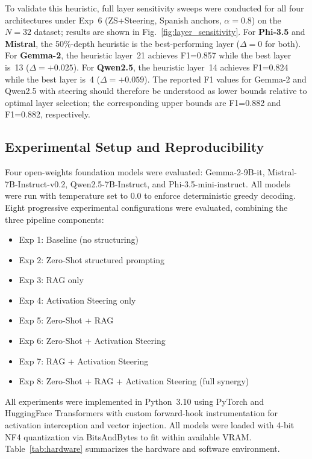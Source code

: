 \documentclass{ieeeaccess}
\begin{document}
To validate this heuristic, full layer sensitivity sweeps were conducted for all four architectures under Exp~6 (ZS+Steering, Spanish anchors, $\alpha=0.8$) on the $N=32$ dataset; results are shown in Fig.~\ref{fig:layer_sensitivity}. For \textbf{Phi-3.5} and \textbf{Mistral}, the 50\%-depth heuristic is the best-performing layer ($\Delta = 0$ for both). For \textbf{Gemma-2}, the heuristic layer~21 achieves F1=0.857 while the best layer is~13 ($\Delta=+0.025$). For \textbf{Qwen2.5}, the heuristic layer~14 achieves F1=0.824 while the best layer is~4 ($\Delta=+0.059$). The reported F1 values for Gemma-2 and Qwen2.5 with steering should therefore be understood as lower bounds relative to optimal layer selection; the corresponding upper bounds are F1=0.882 and F1=0.882, respectively.

\subsection{Experimental Setup and Reproducibility}
\label{sec:setup}

Four open-weights foundation models were evaluated: Gemma-2-9B-it, Mistral-7B-Instruct-v0.2, Qwen2.5-7B-Instruct, and Phi-3.5-mini-instruct. All models were run with temperature set to 0.0 to enforce deterministic greedy decoding. Eight progressive experimental configurations were evaluated, combining the three pipeline components:

\begin{itemize}
    \item Exp 1: Baseline (no structuring)
    \item Exp 2: Zero-Shot structured prompting
    \item Exp 3: RAG only
    \item Exp 4: Activation Steering only
    \item Exp 5: Zero-Shot + RAG
    \item Exp 6: Zero-Shot + Activation Steering
    \item Exp 7: RAG + Activation Steering
    \item Exp 8: Zero-Shot + RAG + Activation Steering (full synergy)
\end{itemize}

All experiments were implemented in Python~3.10 using PyTorch and HuggingFace Transformers with custom forward-hook instrumentation for activation interception and vector injection. All models were loaded with 4-bit NF4 quantization via BitsAndBytes to fit within available VRAM. Table~\ref{tab:hardware} summarizes the hardware and software environment.
\end{document}

